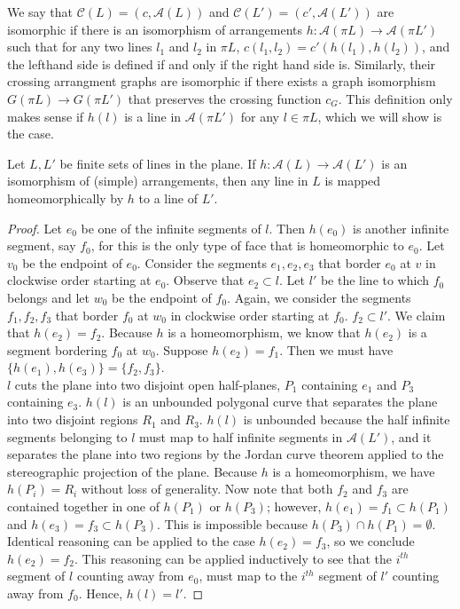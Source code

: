 \documentclass[11pt, oneside]{article}
\begin{document}
We say that $\mathcal{C}(L) = (c, \mathcal{A}(L))$ and $\mathcal{C}(L')  = (c', \mathcal{A}(L'))$ are isomorphic if there is an isomorphism of arrangements $h:\mathcal{A }(\pi L) \to \mathcal{A} (\pi L')$ such that for any two lines $l_1$ and $l_2$ in $\pi L$, $c(l_1, l_2) = c'(h(l_1), h(l_2))$, and the lefthand side is defined if and only if the right hand side is. Similarly, their crossing arrangment graphs are isomorphic if there exists a graph isomorphism $G( \pi L) \to G( \pi L')$ that preserves the crossing function $c_G$. This definition only makes sense if $h(l)$ is a line in $\mathcal{A}(\pi L')$ for any $l \in \pi L$, which we will show is the case. 
 \begin{lem}
Let $L, L'$ be finite sets of lines in the plane. If $h: \mathcal{A}(L) \to \mathcal{A}(L')$ is an isomorphism of (simple) arrangements, then any line in $L$ is mapped homeomorphically by $h$ to a line of $L'$. 
 \end{lem}
\begin{proof}
Let $e_0$ be one of the infinite segments of $l$. Then $h(e_0)$ is another infinite segment, say $f_0$, for this is the only type of face that is homeomorphic to $e_0$. Let $v_0$ be the endpoint of $e_0$. Consider the segments $e_1, e_2, e_3$ that border $e_0$ at $v$ in clockwise order starting at $e_0$. Observe that $e_2 \subset l$. Let $l'$ be the line to which $f_0$ belongs and let $w_0$ be the endpoint of $f_0$. Again, we consider the segments $f_1, f_2, f_3$ that border $f_0$ at $w_0$ in clockwise order starting at $f_0$. $f_2 \subset l'$. We claim that $h(e_2) = f_2$. Because $h$ is a homeomorphism, we know that $h(e_2)$ is a segment bordering $f_0$ at $w_0$. Suppose $h(e_2) = f_1$. Then we must have $\{h(e_1),h(e_3)\} = \{f_2, f_3\}$. \\

 $l$ cuts the plane into two disjoint open half-planes, $P_1$ containing $e_1$ and $P_3$ containing $e_3$. $h(l)$ is an unbounded polygonal curve that separates the plane into two disjoint regions $R_1$ and $R_3$. $h(l)$ is unbounded because the half infinite segments belonging to $l$ must map to half infinite segments in $\mathcal{A}(L')$, and it separates the plane into two regions by the Jordan curve theorem applied to the stereographic projection of the plane. Because $h$ is a homeomorphism, we have $h(P_i) = R_i$ without loss of generality. Now note that both $f_2$ and $f_3$ are contained together in one of $h(P_1)$ or $h(P_3)$; however, $h(e_1) =f_1\subset h(P_1)$ and $h(e_3) = f_3 \subset h(P_3)$. This is impossible because $h(P_3) \cap h(P_1) = \emptyset$. \\
 
 Identical reasoning can be applied to the case $h(e_2) = f_3$, so we conclude $h(e_2) = f_2$. This reasoning can be applied inductively to see that the $i^{th}$ segment of $l$ counting away from $e_0$, must map to the $i^{th}$ segment of $l'$ counting away from $f_0$. Hence, $h(l) = l'$. 
 \end{proof}
 
\end{document}
